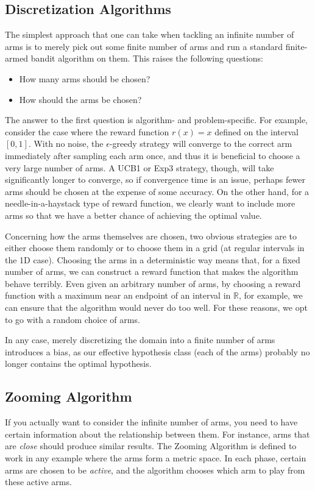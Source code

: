 \documentclass{article}
\begin{document}
\subsection{Discretization Algorithms}
The simplest approach that one can take when tackling an infinite number of
arms is to merely pick out some finite number of arms and run a standard
finite-armed bandit algorithm on them.  This raises the following 
questions:
\begin{itemize}
\item How many arms should be chosen?
\item How should the arms be chosen?
\end{itemize}
The answer to the first question is algorithm- and problem-specific.  For
example, consider the case where the reward function $r(x) = x$ defined
on the interval $[0,1]$.  With no noise, the $\epsilon$-greedy strategy
will converge to the correct arm immediately after sampling each arm once,
and thus it is beneficial to choose a very large number of arms.  A
UCB1 or Exp3 strategy, though, will take significantly longer to
converge, so if convergence time is an issue, perhaps fewer arms should be
chosen at the expense of some accuracy.  On the other hand, for a
needle-in-a-haystack type of reward function, we clearly want to
include more arms so that we have a better chance of achieving the
optimal value.

Concerning how the arms themselves are chosen, two obvious strategies are
to either choose them randomly or to choose them in a grid (at regular
intervals in the 1D case).  Choosing the arms in a deterministic way
means that, for a fixed number of arms, we can construct a reward function
that makes the algorithm behave terribly.  Even given an arbitrary number
of arms, by choosing a reward function with a maximum near an endpoint of
an interval in $\mathbb{R}$, for example, we can ensure that the algorithm
would never do too well.  For these reasons, we opt to go with a random
choice of arms.

In any case, merely discretizing the domain into a finite number of arms
introduces a bias, as our effective hypothesis class (each of the arms)
probably no longer contains the optimal hypothesis.

\subsection{Zooming Algorithm}
If you actually want to consider the infinite number of arms, you need to have certain information about the relationship between them. For instance, arms that are \emph{close} should produce similar results. The Zooming Algorithm is defined to work in any example where the arms form a metric space. In each phase, certain arms are chosen to be \emph{active}, and the algorithm chooses which arm to play from these active arms.
\end{document}

